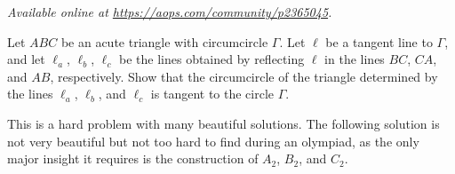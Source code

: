 
\textsl{Available online at \url{https://aops.com/community/p2365045}.}
\begin{mdframed}[style=mdpurplebox,frametitle={Problem statement}]
Let $ABC$ be an acute triangle with circumcircle $\Gamma$.
Let $\ell$ be a tangent line to $\Gamma$, and let $\ell_a$, $\ell_b$, $\ell_c$ be the lines obtained
by reflecting $\ell$ in the lines $BC$, $CA$, and $AB$, respectively.
Show that the circumcircle of the triangle determined by the lines $\ell_a$, $\ell_b$, and $\ell_c$
is tangent to the circle $\Gamma$.
\end{mdframed}
This is a hard problem with many beautiful solutions.
The following solution is not very beautiful but not too hard to find during an olympiad,
as the only major insight it requires is the construction of $A_2$, $B_2$, and $C_2$.

